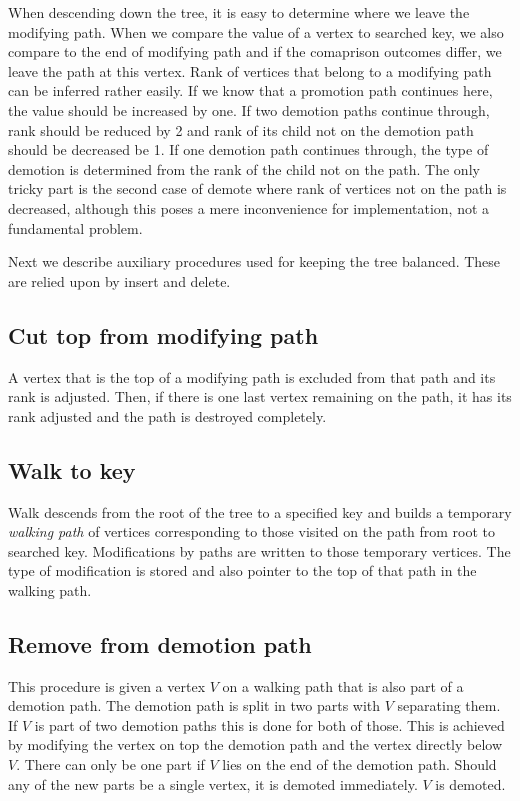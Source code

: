 When descending down the tree, it is easy to determine where we leave the modifying path. When we compare the value of a vertex to searched key, we also compare to the end of modifying path and if the comaprison outcomes differ, we leave the path at this vertex. Rank of vertices that belong to a modifying path can be inferred rather easily. If we know that a promotion path continues here, the value should be increased by one. If two demotion paths continue through, rank should be reduced by 2 and rank of its child not on the demotion path should be decreased be 1. If one demotion path continues through, the type of demotion is determined from the rank of the child not on the path. The only tricky part is the second case of demote where rank of vertices not on the path is decreased, although this poses a mere inconvenience for implementation, not a fundamental problem.

Next we describe auxiliary procedures used for keeping the tree balanced. These are relied upon by insert and delete.

\subsection{Cut top from modifying path}

A vertex that is the top of a modifying path is excluded from that path and its rank is adjusted. Then, if there is one last vertex remaining on the path, it has its rank adjusted and the path is destroyed completely.

\subsection{Walk to key}

Walk descends from the root of the tree to a specified key and builds a temporary {\em walking path} of vertices corresponding to those visited on the path from root to searched key. Modifications by paths are written to those temporary vertices. The type of modification is stored and also pointer to the top of that path in the walking path.

\subsection{Remove from demotion path}

This procedure is given a vertex $V$ on a walking path that is also part of a demotion path. The demotion path is split in two parts with $V$ separating them. If $V$ is part of two demotion paths this is done for both of those. This is achieved by modifying the vertex on top the demotion path and the vertex directly below $V$. There can only be one part if $V$ lies on the end of the demotion path. Should any of the new parts be a single vertex, it is demoted immediately. $V$ is demoted.

